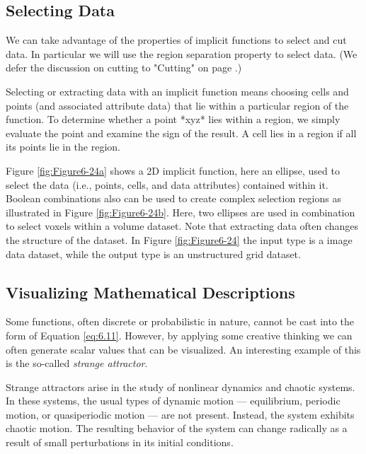 \subsection{Selecting Data}

We can take advantage of the properties of implicit functions to select and cut data. In particular we will use the region separation property to select data. (We defer the discussion on cutting to "Cutting" on page \pageref{subsec:cutting}.)

Selecting or extracting data with an implicit function means choosing cells and points (and associated attribute data) that lie within a particular region of the function. To determine whether a point *xyz* lies within a region, we simply evaluate the point and examine the sign of the result. A cell lies in a region if all its points lie in the region.

Figure \ref{fig:Figure6-24a} shows a 2D implicit function, here an ellipse, used to select the data (i.e., points, cells, and data attributes) contained within it. Boolean combinations also can be used to create complex selection regions as illustrated in Figure \ref{fig:Figure6-24b}. Here, two ellipses are used in combination to select voxels within a volume dataset. Note that extracting data often changes the structure of the dataset. In Figure \ref{fig:Figure6-24} the input type is a image data dataset, while the output type is an unstructured grid dataset.

\subsection{Visualizing Mathematical Descriptions}

Some functions, often discrete or probabilistic in nature, cannot be cast into the form of Equation \ref{eq:6.11}. However, by applying some creative thinking we can often generate scalar values that can be visualized. An interesting example of this is the so-called \emph{strange attractor}.

Strange attractors arise in the study of nonlinear dynamics and chaotic systems. In these systems, the usual types of dynamic motion --- equilibrium, periodic motion, or quasiperiodic motion --- are not present. Instead, the system exhibits chaotic motion. The resulting behavior of the system can change radically as a result of small perturbations in its initial conditions.

